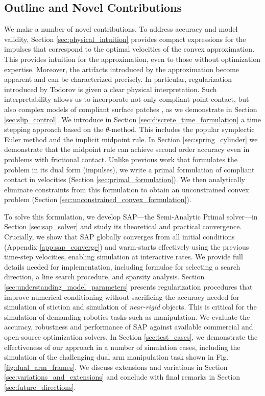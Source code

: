 \subsection{Outline and Novel Contributions}
We make a number of novel contributions. To address accuracy and model validity,
Section \ref{sec:physical_intuition} provides compact expressions for the
impulses that correspond to the optimal velocities of the convex approximation.
This provides intuition for the approximation, even to those without
optimization expertise. Moreover, the artifacts introduced by the approximation
become apparent and can be characterized precisely. In particular,
regularization introduced by Todorov \cite{bib:todorov2014} is given a clear
physical interpretation. Such interpretability  allows us to incorporate not
only compliant point contact, but also complex models of compliant surface
patches \cite{bib:elandt2019pressure}, as we demonstrate in Section
\ref{sec:slip_control}. We introduce in Section
\ref{sec:discrete_time_formulation} a time stepping approach based on the
$\theta\text{-method}$. This includes the popular symplectic Euler method and
the implicit midpoint rule. In Section \ref{sec:spring_cylinder} we demonstrate
that the midpoint rule can achieve second order accuracy even in problems with
frictional contact. Unlike previous work \cite{bib:anitescu2010,bib:todorov2014}
that formulates the problem in its dual form (impulses), we write a primal
formulation of compliant contact in velocities (Section
\ref{sec:primal_formulation}). We then analytically eliminate constraints from
this formulation to obtain an unconstrained convex problem (Section
\ref{sec:unconstrained_convex_formulation}).

To solve this formulation, we develop SAP---the Semi-Analytic Primal solver---in
Section \ref{sec:sap_solver} and study its theoretical and practical
convergence.  Crucially, we show that SAP globally converges from all initial
conditions (Appendix \ref{app:sap_converge}) and warm-starts effectively using
the previous time-step velocities, enabling simulation at interactive rates. We
provide full details needed for implementation, including formulae for selecting
a search direction, a line search procedure, and sparsity analysis. Section
\ref{sec:understanding_model_parameters} presents regularization procedures that
improve numerical conditioning without sacrificing the accuracy needed for
simulation of stiction and simulation of \emph{near-rigid} objects. This is
critical for the simulation of demanding robotics tasks such as manipulation. We
evaluate the accuracy, robustness and performance of SAP against available
commercial and open-source optimization solvers. In Section
\ref{sec:test_cases}, we demonstrate the effectiveness of our approach in a
number of simulation cases, including the simulation of the challenging dual arm
manipulation task shown in Fig. \ref{fig:dual_arm_frames}. We discuss extensions
and variations in Section \ref{sec:variations_and_extensions} and conclude with
final remarks in Section \ref{sec:future_directions}.
